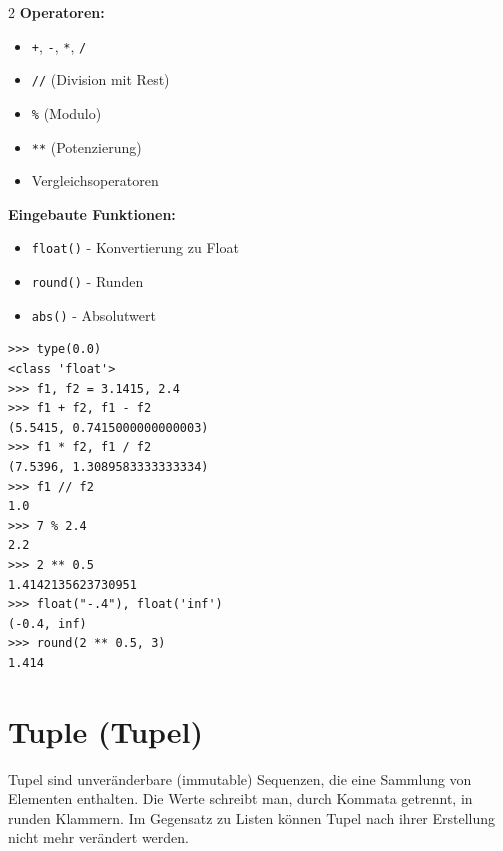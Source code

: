 \documentclass[ngerman,11pt]{article}
\begin{document}
\begin{multicols}{2}\raggedcolumns
\noindent\textbf{Operatoren:}
\begin{itemize}[leftmargin=*]
    \item \texttt{+}, \texttt{-}, \texttt{*}, \texttt{/}
    \item \texttt{//} (Division mit Rest)
    \item \texttt{\%} (Modulo)
    \item \texttt{**} (Potenzierung)
    \item Vergleichsoperatoren
\end{itemize}
\par\bigskip
\noindent\textbf{Eingebaute Funktionen:}
\begin{itemize}[leftmargin=*]
    \item \texttt{float()} - Konvertierung zu Float
    \item \texttt{round()} - Runden
    \item \texttt{abs()} - Absolutwert
\end{itemize}
\columnbreak
\begin{lstlisting}
>>> type(0.0)
<class 'float'>
>>> f1, f2 = 3.1415, 2.4
>>> f1 + f2, f1 - f2
(5.5415, 0.7415000000000003)
>>> f1 * f2, f1 / f2
(7.5396, 1.3089583333333334)
>>> f1 // f2
1.0
>>> 7 % 2.4
2.2
>>> 2 ** 0.5
1.4142135623730951
>>> float("-.4"), float('inf')
(-0.4, inf)
>>> round(2 ** 0.5, 3)
1.414
\end{lstlisting}
\end{multicols}

\section{Tuple (Tupel)}

Tupel sind unveränderbare (immutable) Sequenzen, die eine Sammlung von Elementen enthalten. Die Werte schreibt man, durch Kommata getrennt, in runden Klammern. Im Gegensatz zu Listen können Tupel nach ihrer Erstellung nicht mehr verändert werden.
\end{document}

